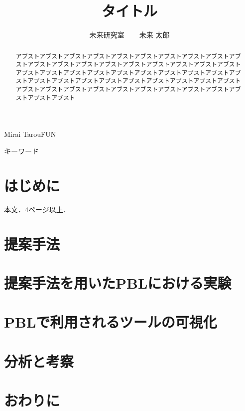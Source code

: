 \documentclass[submit,techrep,noauthor]{ipsj}
\begin{document}
\title{タイトル}


\author{未来研究室 ~~~ 未来 太郎}{Mirai Tarou}{FUN}

\begin{abstract}
  アブストアブストアブストアブストアブストアブストアブストアブストアブストアブストアブストアブストアブストアブストアブストアブストアブストアブストアブストアブストアブストアブストアブストアブストアブストアブストアブストアブストアブストアブストアブストアブストアブストアブストアブストアブストアブストアブストアブストアブストアブストアブストアブストアブストアブストアブストアブストアブストアブストアブスト
\end{abstract}
%
\begin{jkeyword}
  キーワード
\end{jkeyword}
%

\maketitle
\section{はじめに}
本文\cite{sample}．4ページ以上．
\section{提案手法}

\section{提案手法を用いたPBLにおける実験}


\section{PBLで利用されるツールの可視化}


\section{分析と考察}


\section{おわりに}


\end{document}
